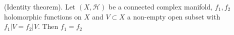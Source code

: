 (Identity theorem). Let $(X, \mathcal{H})$ be a connected complex manifold, $f_1, f_2$ holomorphic functions on $X$ and $V \subset X$ a non-empty open subset with $f_1|V = f_2|V$. Then $f_1 = f_2$
